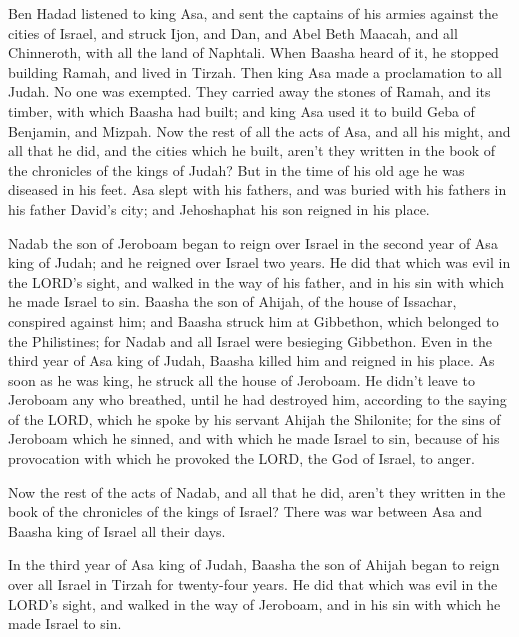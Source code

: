  Ben Hadad listened to king Asa, and sent the captains of
his armies against the cities of Israel, and struck Ijon, and Dan, and
Abel Beth Maacah, and all Chinneroth, with all the land of Naphtali.
 When Baasha heard of it, he stopped building Ramah, and
lived in Tirzah.  Then king Asa made a proclamation to
all Judah. No one was exempted. They carried away the stones of Ramah,
and its timber, with which Baasha had built; and king Asa used it to
build Geba of Benjamin, and Mizpah.  Now the rest of all
the acts of Asa, and all his might, and all that he did, and the cities
which he built, aren't they written in the book of the chronicles of the
kings of Judah? But in the time of his old age he was diseased in his
feet.  Asa slept with his fathers, and was buried with
his fathers in his father David's city; and Jehoshaphat his son reigned
in his place.

 Nadab the son of Jeroboam began to reign over Israel in
the second year of Asa king of Judah; and he reigned over Israel two
years.  He did that which was evil in the LORD's sight,
and walked in the way of his father, and in his sin with which he made
Israel to sin.  Baasha the son of Ahijah, of the house of
Issachar, conspired against him; and Baasha struck him at Gibbethon,
which belonged to the Philistines; for Nadab and all Israel were
besieging Gibbethon.  Even in the third year of Asa king
of Judah, Baasha killed him and reigned in his place.  As
soon as he was king, he struck all the house of Jeroboam. He didn't
leave to Jeroboam any who breathed, until he had destroyed him,
according to the saying of the LORD, which he spoke by his servant
Ahijah the Shilonite;  for the sins of Jeroboam which he
sinned, and with which he made Israel to sin, because of his provocation
with which he provoked the LORD, the God of Israel, to anger.

 Now the rest of the acts of Nadab, and all that he did,
aren't they written in the book of the chronicles of the kings of
Israel?  There was war between Asa and Baasha king of
Israel all their days.

 In the third year of Asa king of Judah, Baasha the son
of Ahijah began to reign over all Israel in Tirzah for twenty-four
years.  He did that which was evil in the LORD's sight,
and walked in the way of Jeroboam, and in his sin with which he made
Israel to sin.

